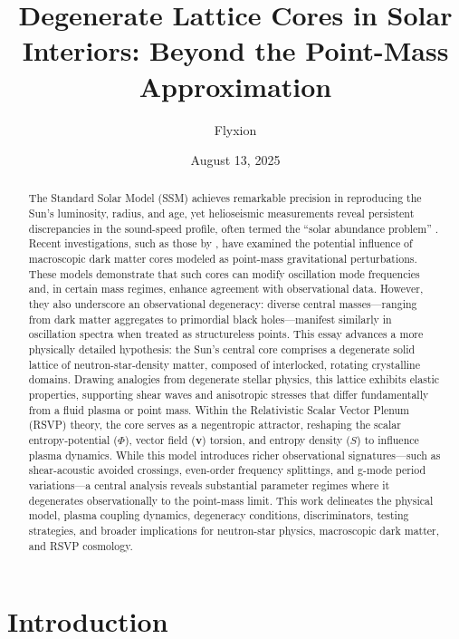 \documentclass{article}
\begin{document}
\title{Degenerate Lattice Cores in Solar Interiors: Beyond the Point-Mass Approximation}
\author{Flyxion}
\date{August 13, 2025}

\maketitle

\begin{abstract}
The Standard Solar Model (SSM) achieves remarkable precision in reproducing the Sun's luminosity, radius, and age, yet helioseismic measurements reveal persistent discrepancies in the sound-speed profile, often termed the ``solar abundance problem'' \citep{buldgen2023}. Recent investigations, such as those by \citet{bellinger2025}, have examined the potential influence of macroscopic dark matter cores modeled as point-mass gravitational perturbations. These models demonstrate that such cores can modify oscillation mode frequencies and, in certain mass regimes, enhance agreement with observational data. However, they also underscore an observational degeneracy: diverse central masses---ranging from dark matter aggregates to primordial black holes---manifest similarly in oscillation spectra when treated as structureless points. This essay advances a more physically detailed hypothesis: the Sun's central core comprises a degenerate solid lattice of neutron-star-density matter, composed of interlocked, rotating crystalline domains. Drawing analogies from degenerate stellar physics, this lattice exhibits elastic properties, supporting shear waves and anisotropic stresses that differ fundamentally from a fluid plasma or point mass. Within the Relativistic Scalar Vector Plenum (RSVP) theory, the core serves as a negentropic attractor, reshaping the scalar entropy-potential ($\Phi$), vector field ($\mathbf{v}$) torsion, and entropy density ($S$) to influence plasma dynamics. While this model introduces richer observational signatures---such as shear-acoustic avoided crossings, even-order frequency splittings, and g-mode period variations---a central analysis reveals substantial parameter regimes where it degenerates observationally to the point-mass limit. This work delineates the physical model, plasma coupling dynamics, degeneracy conditions, discriminators, testing strategies, and broader implications for neutron-star physics, macroscopic dark matter, and RSVP cosmology.
\end{abstract}

\section{Introduction}
\end{document}
